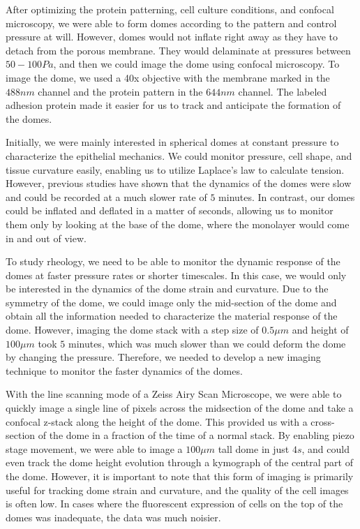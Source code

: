 After optimizing the protein patterning, cell culture conditions, and
confocal microscopy, we were able to form domes according to the pattern
and control pressure at will. However, domes would not inflate right
away as they have to detach from the porous membrane. They would
delaminate at pressures between \(50-100Pa\), and then we could image
the dome using confocal microscopy. To image the dome, we used a 40x
objective with the membrane marked in the \(488nm\) channel and the
protein pattern in the \(644nm\) channel. The labeled adhesion protein
made it easier for us to track and anticipate the formation of the
domes.

Initially, we were mainly interested in spherical domes at constant
pressure to characterize the epithelial mechanics. We could monitor
pressure, cell shape, and tissue curvature easily, enabling us to
utilize Laplace's law to calculate tension. However, previous studies
have shown that the dynamics of the domes were slow and could be
recorded at a much slower rate of \(5\) minutes. In contrast, our domes
could be inflated and deflated in a matter of seconds, allowing us to
monitor them only by looking at the base of the dome, where the
monolayer would come in and out of view.

To study rheology, we need to be able to monitor the dynamic response of
the domes at faster pressure rates or shorter timescales. In this case,
we would only be interested in the dynamics of the dome strain and
curvature. Due to the symmetry of the dome, we could image only the
mid-section of the dome and obtain all the information needed to
characterize the material response of the dome. However, imaging the
dome stack with a step size of \(0.5\mu m\) and height of \(100 \mu m\)
took \(5\) minutes, which was much slower than we could deform the dome
by changing the pressure. Therefore, we needed to develop a new imaging
technique to monitor the faster dynamics of the domes.

With the line scanning mode of a Zeiss Airy Scan Microscope, we were
able to quickly image a single line of pixels across the midsection of
the dome and take a confocal z-stack along the height of the dome. This
provided us with a cross-section of the dome in a fraction of the time
of a normal stack. By enabling piezo stage movement, we were able to
image a \(100\mu m\) tall dome in just \(4s\), and could even track the
dome height evolution through a kymograph of the central part of the
dome. However, it is important to note that this form of imaging is
primarily useful for tracking dome strain and curvature, and the quality
of the cell images is often low. In cases where the fluorescent
expression of cells on the top of the domes was inadequate, the data was
much noisier.

